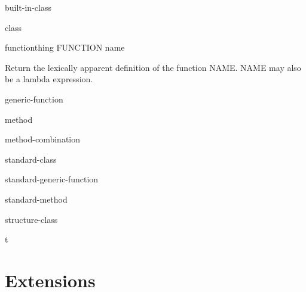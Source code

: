 \documentclass[10pt,english]{book}
\begin{document}
\begin{class}{built-in-class}{}
  
\end{class}

\begin{class}{class}{}
  
\end{class}

\begin{class}{function}{thing}
  FUNCTION name

Return the lexically apparent definition of the function NAME. NAME may also
be a lambda expression.
\end{class}

\begin{class}{generic-function}{}
  
\end{class}

\begin{class}{method}{}
  
\end{class}

\begin{class}{method-combination}{}
  
\end{class}

\begin{class}{standard-class}{}
  
\end{class}

\begin{class}{standard-generic-function}{}
  
\end{class}

\begin{class}{standard-method}{}
  
\end{class}

\begin{class}{structure-class}{}
  
\end{class}

\begin{class}{t}{}
  
\end{class}

\section{Extensions}
\label{sec:extensions}
\end{document}
